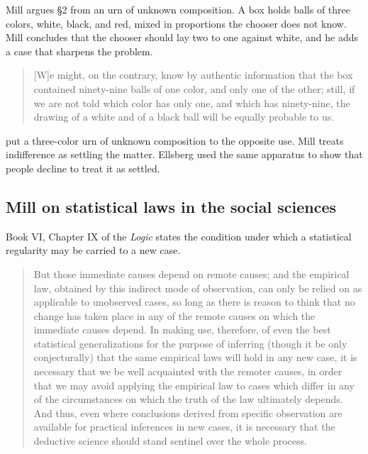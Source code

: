 \documentclass[12pt]{article}
\begin{document}
Mill argues \S2 from an urn of unknown composition.  A box holds balls of three
colors, white, black, and red, mixed in proportions the chooser does not know.
Mill concludes that the chooser should lay two to one against white, and he
adds a case that sharpens the problem.

\begin{quote}
[W]e might, on the contrary, know by authentic information that the box
contained ninety-nine balls of one color, and only one of the other; still, if
we are not told which color has only one, and which has ninety-nine, the drawing
of a white and of a black ball will be equally probable to us.
\hfill \citep[Bk.~III, ch.~XVIII, \S2]{Mill1882Logic}
\end{quote}

\citet{Ellsberg1961} put a three-color urn of unknown composition to the
opposite use.  Mill treats indifference as settling the matter.  Ellsberg used
the same apparatus to show that people decline to treat it as settled.

\subsection{Mill on statistical laws in the social sciences}

Book VI, Chapter IX of the \emph{Logic} states the condition under which a
statistical regularity may be carried to a new case.

\begin{quote}
But those immediate causes depend on remote causes; and the empirical law,
obtained by this indirect mode of observation, can only be relied on as
applicable to unobserved cases, so long as there is reason to think that no
change has taken place in any of the remote causes on which the immediate causes
depend.  In making use, therefore, of even the best statistical generalizations
for the purpose of inferring (though it be only conjecturally) that the same
empirical laws will hold in any new case, it is necessary that we be well
acquainted with the remoter causes, in order that we may avoid applying the
empirical law to cases which differ in any of the circumstances on which the
truth of the law ultimately depends.  And thus, even where conclusions derived
from specific observation are available for practical inferences in new cases,
it is necessary that the deductive science should stand sentinel over the whole
process.
\hfill \citep[Bk.~VI, ch.~IX, \S5]{Mill1882Logic}
\end{quote}
\end{document}
